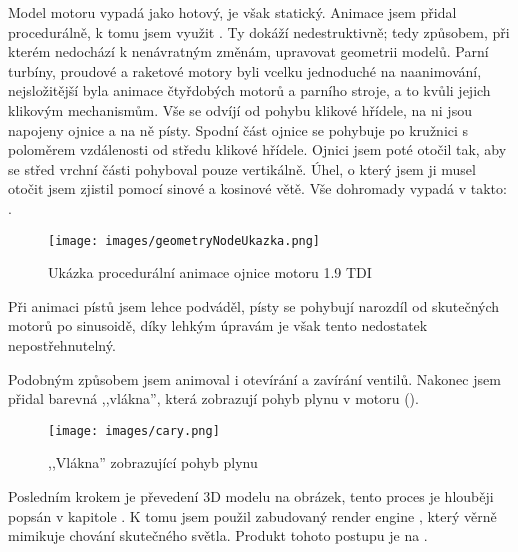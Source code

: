 {Model motoru vypadá jako hotový, je však statický. Animace jsem přidal procedurálně, k tomu jsem využit . Ty dokáží nedestruktivně; tedy způsobem, při kterém nedochází k nenávratným změnám, upravovat geometrii modelů. Parní turbíny, proudové a raketové motory byli vcelku jednoduché na naanimování, nejsložitější byla animace čtyřdobých motorů a parního stroje, a to kvůli jejich klikovým mechanismům.}\odst
{Vše se odvíjí od pohybu klikové hřídele, na ni jsou napojeny ojnice a na ně písty. Spodní část ojnice se pohybuje po kružnici s poloměrem vzdálenosti od středu klikové hřídele. Ojnici jsem poté otočil tak, aby se střed vrchní části pohyboval pouze vertikálně. Úhel, o který jsem ji musel otočit jsem zjistil pomocí sinové a kosinové větě. Vše dohromady vypadá v  takto: .}

\begin{figure}[H]
    \centering
    \texttt{[image: images/geometryNodeUkazka.png]}
    \caption{Ukázka procedurální animace ojnice motoru 1.9 TDI \jaObr}
    \label{obr:geometryNodeUkazka}
\end{figure}

{Při animaci pístů jsem lehce podváděl, písty se pohybují narozdíl od skutečných motorů po sinusoidě, díky lehkým úpravám je však tento nedostatek nepostřehnutelný.}

\newpage

{Podobným způsobem jsem animoval i otevírání a zavírání ventilů. Nakonec jsem přidal barevná ,,vlákna'', která zobrazují pohyb plynu v motoru ().}

\begin{figure}[H]
    \centering
    \texttt{[image: images/cary.png]}
    \caption{,,Vlákna'' zobrazující pohyb plynu \jaObr}
    \label{obr:1.9TDICary}
\end{figure}

{Posledním krokem je převedení 3D modelu na obrázek, tento proces je hlouběji popsán v kapitole . K tomu jsem použil zabudovaný render engine , který věrně mimikuje chování skutečného světla. Produkt tohoto postupu je na .}

